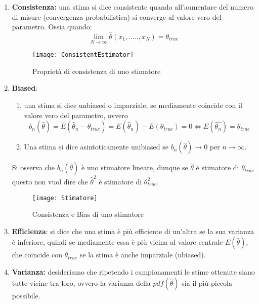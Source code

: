 \documentclass[11pt,a4paper]{book}
\begin{document}
\begin{enumerate}
	\item \textbf{Consistenza:} una stima si dice consistente quando all'aumentare del numero di misure (convergenza probabilistica) si converge al valore vero del parametro. Ossia quando:
	\begin{equation}
		\lim_{N \rightarrow \infty} \hat{\theta}(x_1,.....,x_N) = \theta_{true} 
	\end{equation}
	 
\begin{figure}[ht]
\vspace{0.6in}
\texttt{[image: ConsistentEstimator]}	
\centering
\vspace{0.3in}
\caption{Propriet\`{a} di consistenza di uno stimatore}
\end{figure}
	
	\item \textbf{Biased}: 
	\begin{enumerate}
	\item una stima si dice unbiased o imparziale, se mediamente coincide con il valore vero del parametro, ovvero 
	\begin{equation}
		b_{n}(\hat{\theta}) = E(\hat{\theta}_n - \theta_{true}) = E(\hat{\theta}_n) - E(\theta_{true}) = 0 
		\iff E(\hat{\theta_n}) = \theta_{true} 
	\end{equation}
	
	\item Una stima si dice asintoticamente unibiased se $b_n(\hat{\theta}) \rightarrow 0$ per $n \rightarrow \infty $.\newline
	\end{enumerate}
	Si osserva che $b_n{}(\hat{\theta})$ \`{e} uno stimatore lineare, dunque se $\hat{\theta}$ \`{e} stimatore di $\theta_{true}$ questo non vuol dire che $\hat{\theta}^2$ \`{e} stimatore di $\theta_{true}^2$.
	
	 
\begin{figure}[!ht]
\vspace{0.3in}
\texttt{[image: Stimatore]}	
\centering
\vspace{0.3in}
\caption{Consistenza e Bias di uno stimatore}
\end{figure}
	
\item \textbf{Efficienza}: si dice che una stima \`{e} pi\`{u} efficiente di un'altra se la sua varianza \`{e} inferiore, quindi se mediamente essa \`{e} pi\`{u} vicina al valore centrale $E(\hat{\theta})$, che coincide con $\theta_{true}$ se la stima \`{e} anche imparziale (ubiased). 

\item \textbf{Varianza:} desideriamo che ripetendo i campionamenti le stime ottenute siano tutte vicine tra loro, ovvero la varianza della $pdf(\hat{\theta})$ sia il pi\`{u} piccola possibile.
\end{enumerate}
\end{document}
